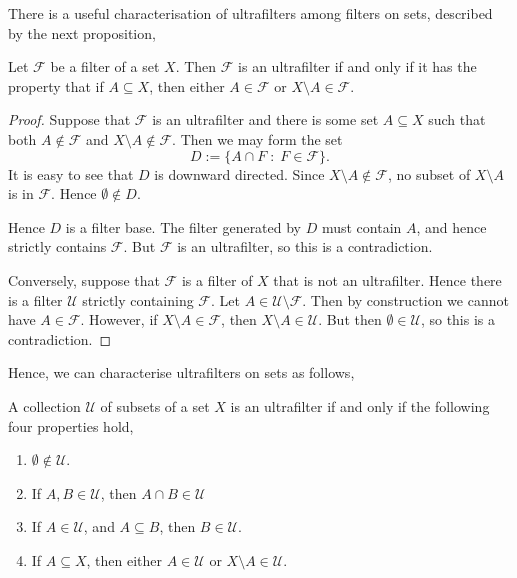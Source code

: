 There is a useful characterisation of ultrafilters among filters on sets, described
by the next proposition,
\begin{proposition}
    Let $\mathcal{F}$ be a filter of a set $X$. Then $\mathcal{F}$
    is an ultrafilter if and only if it has the property that if $A \subseteq X$,
    then either $A \in \mathcal{F}$ or $X \setminus A \in \mathcal{F}$.
\end{proposition}
\begin{proof}
    Suppose that $\mathcal{F}$ is an ultrafilter and there is some set $A \subseteq X$
    such that both $A \notin \mathcal{F}$ and $X\setminus A \notin \mathcal{F}$. Then
    we may form the set
    \begin{equation*}
        D := \{A \cap F\;:\;F \in \mathcal{F}\}.
    \end{equation*}
    It is easy to see that $D$ is downward directed.
    Since $X \setminus A \notin \mathcal{F}$, no subset of $X \setminus A$ is
    in $\mathcal{F}$. Hence $\emptyset \notin D$.

    Hence $D$
    is a filter base. The filter
    generated by $D$ must contain $A$, and hence strictly contains $\mathcal{F}$.
    But $\mathcal{F}$ is an ultrafilter, so this is a contradiction. 

    Conversely, suppose that $\mathcal{F}$ is a filter of $X$ that is not
    an ultrafilter. Hence there is a filter $\mathcal{U}$
    strictly containing $\mathcal{F}$. Let $A \in \mathcal{U} \setminus \mathcal{F}$. 
    Then by construction we cannot have $A \in \mathcal{F}$. However,
    if $X \setminus A \in \mathcal{F}$, then $X \setminus A \in \mathcal{U}$.
    But then $\emptyset \in \mathcal{U}$, so this is a contradiction.
\end{proof}

Hence, we can characterise ultrafilters on sets as follows,
\begin{corollary}
    A collection $\mathcal{U}$ of subsets of a set $X$ is an ultrafilter
    if and only if the following four properties hold,
    \begin{enumerate}
        \item{} $\emptyset \notin \mathcal{U}$.
        \item{} If $A,B \in \mathcal{U}$, then $A \cap B \in \mathcal{U}$
        \item{} If $A \in \mathcal{U}$, and $A \subseteq B$, then $B \in \mathcal{U}$.
        \item{} If $A \subseteq X$, then either $A \in \mathcal{U}$
        or $X \setminus A \in \mathcal{U}$.
    \end{enumerate}
\end{corollary}

